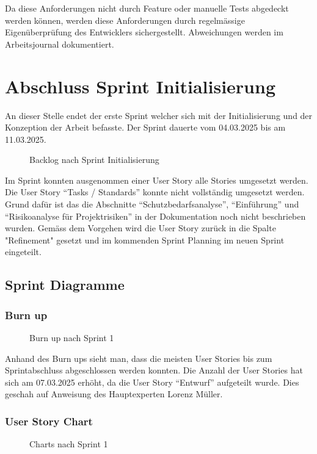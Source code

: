 Da diese Anforderungen nicht durch Feature oder manuelle Tests abgedeckt werden können, werden diese Anforderungen
durch regelmässige Eigenüberprüfung des Entwicklers sichergestellt. Abweichungen werden im Arbeitsjournal dokumentiert. 


\chapter{Abschluss Sprint Initialisierung}
An dieser Stelle endet der erste Sprint welcher sich mit der Initialisierung und der Konzeption der
Arbeit befasste. Der Sprint dauerte vom 04.03.2025 bis am 11.03.2025.

\begin{figure}[h]
   \centering
   \caption{Backlog nach Sprint Initialisierung}
\end{figure}

Im Sprint konnten ausgenommen einer User Story alle Stories umgesetzt werden. 
Die User Story ``Tasks / Standards'' konnte nicht vollständig umgesetzt werden. 
Grund dafür ist das die Abschnitte ``Schutzbedarfsanalyse'', ``Einführung'' und ``Risikoanalyse für Projektrisiken'' in der Dokumentation noch nicht beschrieben wurden. 
Gemäss dem Vorgehen wird die User Story zurück in die Spalte "Refinement" gesetzt und im kommenden Sprint Planning im neuen Sprint eingeteilt.

\newpage

\section{Sprint Diagramme}

\subsection{Burn up}

\begin{figure}[h]
   \centering
   \caption{Burn up nach Sprint 1}
\end{figure}

Anhand des Burn ups sieht man, dass die meisten User Stories bis zum Sprintabschluss abgeschlossen werden konnten.
Die Anzahl der User Stories hat sich am 07.03.2025 erhöht, da die User Story ``Entwurf'' aufgeteilt wurde. Dies geschah auf Anweisung
des Hauptexperten Lorenz Müller.

\subsection{User Story Chart}
\begin{figure}[h]
   \centering
   \caption{Charts nach Sprint 1}
\end{figure}

